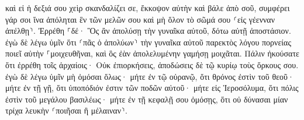 \documentclass{openreader}
\begin{document}
καὶ εἰ ἡ δεξιά σου χεὶρ σκανδαλίζει σε, ἔκκοψον αὐτὴν καὶ βάλε ἀπὸ σοῦ, συμφέρει γάρ σοι ἵνα ἀπόληται ἓν τῶν μελῶν σου καὶ μὴ ὅλον τὸ σῶμά σου ⸂εἰς γέενναν ἀπέλθῃ⸃. 
Ἐρρέθη ⸀δέ· Ὃς ἂν ἀπολύσῃ τὴν γυναῖκα αὐτοῦ, δότω αὐτῇ ἀποστάσιον. 
ἐγὼ δὲ λέγω ὑμῖν ὅτι ⸂πᾶς ὁ ἀπολύων⸃ τὴν γυναῖκα αὐτοῦ παρεκτὸς λόγου πορνείας ποιεῖ αὐτὴν ⸀μοιχευθῆναι, καὶ ὃς ἐὰν ἀπολελυμένην γαμήσῃ μοιχᾶται. 
Πάλιν ἠκούσατε ὅτι ἐρρέθη τοῖς ἀρχαίοις· Οὐκ ἐπιορκήσεις, ἀποδώσεις δὲ τῷ κυρίῳ τοὺς ὅρκους σου. 
ἐγὼ δὲ λέγω ὑμῖν μὴ ὀμόσαι ὅλως· μήτε ἐν τῷ οὐρανῷ, ὅτι θρόνος ἐστὶν τοῦ θεοῦ· 
μήτε ἐν τῇ γῇ, ὅτι ὑποπόδιόν ἐστιν τῶν ποδῶν αὐτοῦ· μήτε εἰς Ἱεροσόλυμα, ὅτι πόλις ἐστὶν τοῦ μεγάλου βασιλέως· 
μήτε ἐν τῇ κεφαλῇ σου ὀμόσῃς, ὅτι οὐ δύνασαι μίαν τρίχα λευκὴν ⸂ποιῆσαι ἢ μέλαιναν⸃. 
\end{document}
